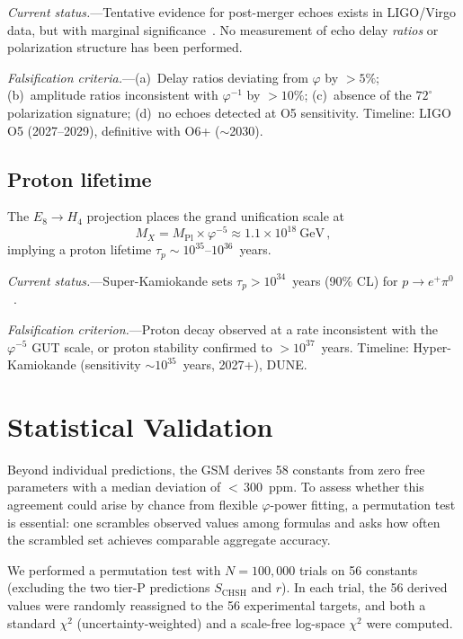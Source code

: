 \documentclass[aps,prl,twocolumn,superscriptaddress,nofootinbib]{revtex4-2}
\newcommand{\vp}{\varphi}
\begin{document}
\emph{Current status.}---Tentative evidence for post-merger echoes exists
in LIGO/Virgo data, but with marginal significance~\cite{abedi2017}.
No measurement of echo delay \emph{ratios} or polarization structure has
been performed.

\emph{Falsification criteria.}---(a)~Delay ratios deviating from $\vp$ by
$>5\%$; (b)~amplitude ratios inconsistent with $\vp^{-1}$ by $>10\%$;
(c)~absence of the $72^\circ$ polarization signature; (d)~no echoes detected
at O5 sensitivity.  Timeline: LIGO O5 (2027--2029), definitive with O6+
($\sim$2030).

\subsection{Proton lifetime}
\label{sec:protondecay}

The $E_8 \to H_4$ projection places the grand unification scale at
\begin{equation}
  M_X = M_{\mathrm{Pl}} \times \vp^{-5} \approx 1.1 \times 10^{18}~\text{GeV}\,,
  \label{eq:mx}
\end{equation}
implying a proton lifetime $\tau_p \sim 10^{35}$--$10^{36}$~years.

\emph{Current status.}---Super-Kamiokande sets $\tau_p > 10^{34}$~years
(90\% CL) for $p \to e^+\pi^0$~\cite{superk2020}.

\emph{Falsification criterion.}---Proton decay observed at a rate
inconsistent with the $\vp^{-5}$ GUT scale, or proton stability confirmed
to $> 10^{37}$~years.  Timeline: Hyper-Kamiokande (sensitivity
$\sim 10^{35}$~years, 2027+), DUNE.

\section{Statistical Validation}

Beyond individual predictions, the GSM derives 58 constants from zero
free parameters with a median deviation of ${<}\,300$~ppm.
To assess whether this agreement could arise by chance from flexible
$\vp$-power fitting, a permutation test is essential: one scrambles
observed values among formulas and asks how often the scrambled set
achieves comparable aggregate accuracy.

We performed a permutation test with $N = 100{,}000$ trials on
56 constants (excluding the two tier-P predictions $S_\text{CHSH}$ and $r$).
In each trial, the 56 derived values were randomly reassigned to the 56
experimental targets, and both a standard $\chi^2$ (uncertainty-weighted) and
a scale-free log-space $\chi^2$ were computed.
\end{document}
